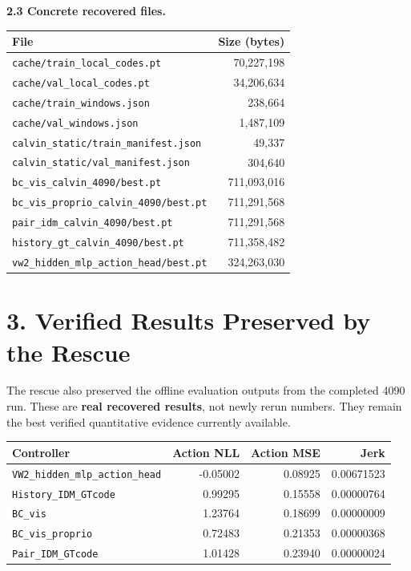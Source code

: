 \documentclass[11pt]{article}
\begin{document}
\textbf{2.3 Concrete recovered files.}
\begin{center}
\small
\begin{tabular}{@{}l r@{}}
\toprule
\textbf{File} & \textbf{Size (bytes)} \\
\midrule
\texttt{cache/train\_local\_codes.pt} & 70,227,198 \\
\texttt{cache/val\_local\_codes.pt} & 34,206,634 \\
\texttt{cache/train\_windows.json} & 238,664 \\
\texttt{cache/val\_windows.json} & 1,487,109 \\
\texttt{calvin\_static/train\_manifest.json} & 49,337 \\
\texttt{calvin\_static/val\_manifest.json} & 304,640 \\
\texttt{bc\_vis\_calvin\_4090/best.pt} & 711,093,016 \\
\texttt{bc\_vis\_proprio\_calvin\_4090/best.pt} & 711,291,568 \\
\texttt{pair\_idm\_calvin\_4090/best.pt} & 711,291,568 \\
\texttt{history\_gt\_calvin\_4090/best.pt} & 711,358,482 \\
\texttt{vw2\_hidden\_mlp\_action\_head/best.pt} & 324,263,030 \\
\bottomrule
\end{tabular}
\end{center}

\section*{3. Verified Results Preserved by the Rescue}
The rescue also preserved the offline evaluation outputs from the completed 4090 run. These are \textbf{real recovered results}, not newly rerun numbers. They remain the best verified quantitative evidence currently available.

\begin{center}
\small
{}
\begin{tabular}{@{}l r r r@{}}
\toprule
\rowcolor{ReportBlue!12}
\textbf{Controller} & \textbf{Action NLL} & \textbf{Action MSE} & \textbf{Jerk} \\
\midrule
\texttt{VW2\_hidden\_mlp\_action\_head} & -0.05002 & 0.08925 & 0.00671523 \\
\texttt{History\_IDM\_GTcode} & 0.99295 & 0.15558 & 0.00000764 \\
\texttt{BC\_vis} & 1.23764 & 0.18699 & 0.00000009 \\
\texttt{BC\_vis\_proprio} & 0.72483 & 0.21353 & 0.00000368 \\
\texttt{Pair\_IDM\_GTcode} & 1.01428 & 0.23940 & 0.00000024 \\
\bottomrule
\end{tabular}
\end{center}
\end{document}
